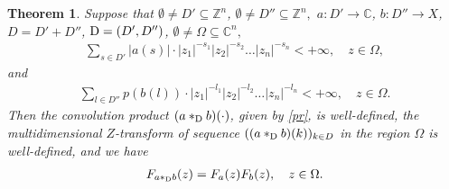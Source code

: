 \documentclass{amsart}
\newtheorem{thm}{Theorem}[section]
\theoremstyle{definition}
\theoremstyle{remark}
\numberwithin{equation}{section}
\begin{document}
\begin{thm}\label{dsp}
Suppose that $\emptyset \neq D' \subseteq {\mathbb Z}^{n}$, $\emptyset \neq D'' \subseteq {\mathbb Z}^{n},$ $a:D' \rightarrow {\mathbb C}$, $b: D'' \rightarrow X$, $D =D'+D''$, ${\rm D}=(D',D'')$, $\emptyset \neq \Omega \subseteq {\mathbb C}^{n},$
\begin{align}\label{pr1} 
\sum_{s\in D'}|a(s)| \cdot \bigl|z_{1}\bigr|^{-s_{1}}\bigl|z_{2}\bigr|^{-s_{2}}\ldots \bigl| z_{n}\bigr|^{-s_{n}}<+\infty,\quad z\in \Omega ,
\end{align} 
and
\begin{align}\label{pr2} \sum_{l\in D''}p(b(l)) \cdot
\bigl|z_{1}\bigr|^{-l_{1}}\bigl|z_{2}\bigr|^{-l_{2}}\ldots \bigl| z_{n}\bigr|^{-l_{n}}<+\infty ,\quad z\in \Omega.
\end{align}
Then the convolution product $(a\ast_{{\rm D}} b)(\cdot)$, given by \eqref{pr}, is well-defined, the multidimensional $Z$-transform of sequence $((a\ast_{{\rm D}} b)(k))_{k\in D}$ in the region $\Omega$ is well-defined, and we have 
\begin{align}\label{psd1}
F_{a\ast_{{\rm D}} b}(z)=F_{a}(z)F_{b}(z), \quad z\in \Omega.
\end{align} 
\end{thm}
\end{document}
